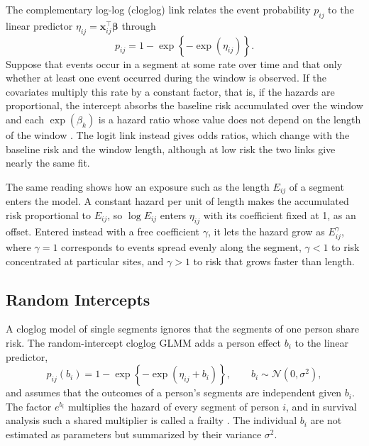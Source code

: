The complementary log-log (cloglog) link relates the event probability $p_{ij}$ to the linear predictor $\eta_{ij} = \mathbf{x}_{ij}^\top \boldsymbol{\beta}$ through
\begin{equation}
  p_{ij} = 1 - \exp\!\left\{-\exp(\eta_{ij})\right\} .
  \label{eq:tech-cloglog}
\end{equation}
Suppose that events occur in a segment at some rate over time and that only whether at least one event occurred during the window is observed.
If the covariates multiply this rate by a constant factor, that is, if the hazards are proportional, the intercept absorbs the baseline risk accumulated over the window and each $\exp(\beta_k)$ is a hazard ratio whose value does not depend on the length of the window \cite{prentice1978grouped}.
The logit link instead gives odds ratios, which change with the baseline risk and the window length, although at low risk the two links give nearly the same fit.

The same reading shows how an exposure such as the length $E_{ij}$ of a segment enters the model.
A constant hazard per unit of length makes the accumulated risk proportional to $E_{ij}$, so $\log E_{ij}$ enters $\eta_{ij}$ with its coefficient fixed at 1, as an offset.
Entered instead with a free coefficient $\gamma$, it lets the hazard grow as $E_{ij}^{\gamma}$, where $\gamma = 1$ corresponds to events spread evenly along the segment, $\gamma < 1$ to risk concentrated at particular sites, and $\gamma > 1$ to risk that grows faster than length.

\subsection{Random Intercepts}
\label{sec:tech-glmm}

A cloglog model of single segments ignores that the segments of one person share risk.
The random-intercept cloglog GLMM adds a person effect $b_i$ to the linear predictor,
\begin{equation}
  p_{ij}(b_i) = 1 - \exp\!\left\{-\exp(\eta_{ij} + b_i)\right\},
  \qquad
  b_i \sim \mathcal{N}(0, \sigma^2),
  \label{eq:tech-glmm}
\end{equation}
and assumes that the outcomes of a person's segments are independent given $b_i$.
The factor $e^{b_i}$ multiplies the hazard of every segment of person $i$, and in survival analysis such a shared multiplier is called a frailty \cite{duchateau2008frailty}. %
The individual $b_i$ are not estimated as parameters but summarized by their variance $\sigma^2$.


